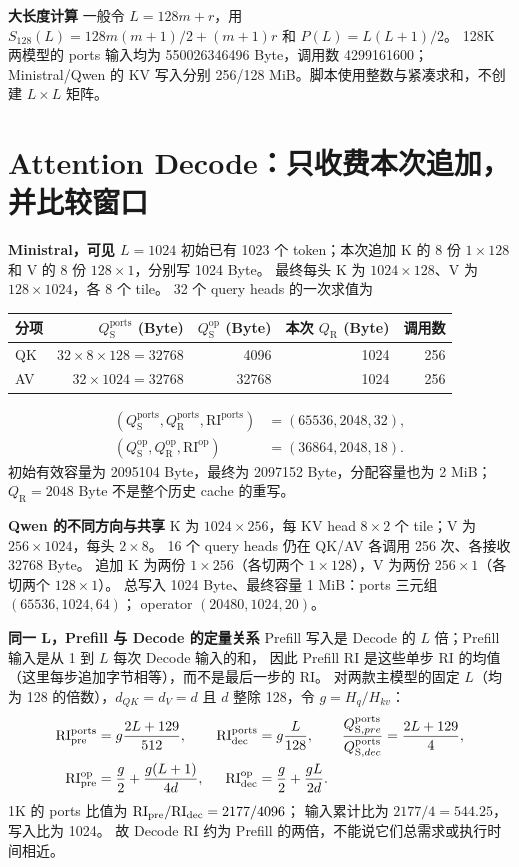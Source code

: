 \documentclass[11pt,a4paper,fontset=fandol]{ctexart}
\newcommand{\qs}{Q_{\mathrm S}}
\newcommand{\qr}{Q_{\mathrm R}}
\newcommand{\RI}{\mathrm{RI}}
\newcommand{\op}{\mathrm{op}}
\newcommand{\loc}{\mathrm{ports}}
\newcommand{\para}[1]{\par\smallskip\noindent\textbf{#1}\quad}
\begin{document}
\para{大长度计算}
一般令 $L=128m+r$，用
$S_{128}(L)=128m(m+1)/2+(m+1)r$ 和 $P(L)=L(L+1)/2$。
128K 两模型的 ports 输入均为 550026346496 Byte，调用数 4299161600；
Ministral/Qwen 的 KV 写入分别 256/128 MiB。脚本使用整数与紧凑求和，不创建 $L\times L$ 矩阵。

\clearpage
\section{Attention Decode：只收费本次追加，并比较窗口}
\para{Ministral，可见 $L=1024$}
初始已有 1023 个 token；本次追加 K 的 8 份 $1\times128$ 和 V 的 8 份
$128\times1$，分别写 1024 Byte。
最终每头 K 为 $1024\times128$、V 为 $128\times1024$，各 8 个 tile。
32 个 query heads 的一次求值为
\begin{center}\small
\begin{tabular}{@{}lrrrr@{}}\toprule
分项 & $\qs^{\loc}$ (Byte) & $\qs^{\op}$ (Byte) & 本次 $\qr$ (Byte) & 调用数\\\midrule
QK & $32\times8\times128=32768$ & 4096 & 1024 & 256\\
AV & $32\times1024=32768$ & 32768 & 1024 & 256\\\bottomrule
\end{tabular}\end{center}
\begin{align*}
(\qs^{\loc},\qr^{\loc},\RI^{\loc})&=(65536,2048,32),\\
(\qs^{\op},\qr^{\op},\RI^{\op})&=(36864,2048,18).
\end{align*}
初始有效容量为 2095104 Byte，最终为 2097152 Byte，分配容量也为 2 MiB；
$\qr=2048$ Byte 不是整个历史 cache 的重写。

\para{Qwen 的不同方向与共享}
K 为 $1024\times256$，每 KV head $8\times2$ 个 tile；V 为 $256\times1024$，每头 $2\times8$。
16 个 query heads 仍在 QK/AV 各调用 256 次、各接收 32768 Byte。
追加 K 为两份 $1\times256$（各切两个 $1\times128$），V 为两份 $256\times1$（各切两个 $128\times1$）。
总写入 1024 Byte、最终容量 1 MiB：ports 三元组 $(65536,1024,64)$；
operator $(20480,1024,20)$。

\para{同一 L，Prefill 与 Decode 的定量关系}
Prefill 写入是 Decode 的 $L$ 倍；Prefill 输入是从 1 到 $L$ 每次 Decode 输入的和，
因此 Prefill RI 是这些单步 RI 的均值（这里每步追加字节相等），而不是最后一步的 RI。
对两款主模型的固定 $L$（均为 128 的倍数），$d_{QK}=d_V=d$ 且 $d$ 整除 128，令 $g=H_q/H_{kv}$：
\begin{align*}
\RI^{\loc}_{\rm pre}&=g\frac{2L+129}{512},&
\RI^{\loc}_{\rm dec}&=g\frac{L}{128},&
\frac{Q_{\mathrm S,pre}^{\loc}}{Q_{\mathrm S,dec}^{\loc}}&=\frac{2L+129}{4},\\
\RI^{\op}_{\rm pre}&=\frac g2+\frac{g(L+1)}{4d},&
\RI^{\op}_{\rm dec}&=\frac g2+\frac{gL}{2d}.&&
\end{align*}
1K 的 ports 比值为 $\RI_{\rm pre}/\RI_{\rm dec}=2177/4096$；
输入累计比为 $2177/4=544.25$，写入比为 1024。
故 Decode RI 约为 Prefill 的两倍，不能说它们总需求或执行时间相近。
\end{document}
